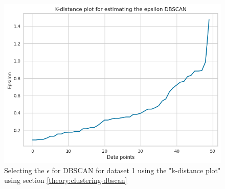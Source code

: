 \begin{figure}
  \includegraphics{Appendix/parameter-selection/selecting-eps.png}
  \caption{Selecting the $\epsilon$ for DBSCAN for dataset 1 using the "k-distance plot" using section \ref{theory:clustering-dbscan}}
  \label{hyperparameters:DBSCAN-dataset1}
\end{figure}